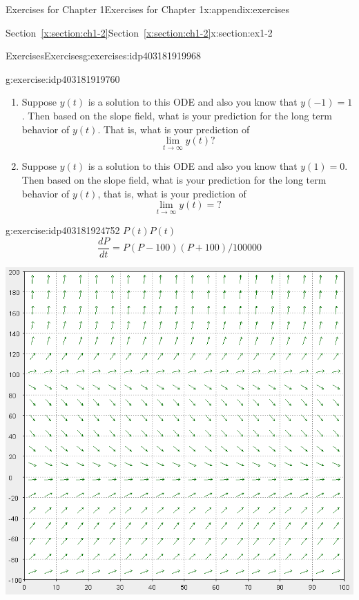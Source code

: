 \documentclass[oneside,10pt,]{book}
\newcommand{\xreffont}{\relax}
\numberwithin{equation}{section}
\numberwithin{equation}{section}
\begin{document}
\begin{appendixptx}{Exercises for Chapter 1}{}{Exercises for Chapter 1}{}{}{x:appendix:exercises}
\begin{sectionptx}{Section~{\xreffont\ref*{x:section:ch1-2}}}{}{Section~{\xreffont\ref*{x:section:ch1-2}}}{}{}{x:section:ex1-2}
\begin{exercises-subsection-numberless}{Exercises}{}{Exercises}{}{}{g:exercises:idp403181919968}
\begin{divisionexercise}{2}{}{}{g:exercise:idp403181919760}
\begin{image}{0}{1}{0}
\end{image}%
%
\begin{enumerate}[label=(\alph*)]
\item{}Suppose \(y(t)\) is a solution to this ODE and also you know that \(y\left(-1\right)=1\). Then based on the slope field, what is your prediction for the long term behavior of \(y(t)\). That is, what is your prediction of%
\begin{equation*}
\lim_{t\to\infty}y(t)?
\end{equation*}
%
\item{}Suppose \(y(t)\) is a solution to this ODE and also you know that \(y\left(1\right)=0\). Then based on the slope field, what is your prediction for the long term behavior of \(y(t)\), that is, what is your prediction of%
\begin{equation*}
\lim_{t\to\infty}y(t)=?
\end{equation*}
%
\end{enumerate}
\end{divisionexercise}%
\begin{divisionexercise}{3}{}{}{g:exercise:idp403181924752}%
\(P(t)\)\(P(t)\)%
\begin{equation*}
\frac{dP}{dt}=P\left(P-100\right)\left(P+100\right)/100000
\end{equation*}
\begin{image}{0}{1}{0}%
\includegraphics[width=\linewidth]{images/1.2-3b.png}

\end{image}
\end{divisionexercise}
\end{exercises-subsection-numberless}
\end{sectionptx}
\end{appendixptx}
\end{document}
